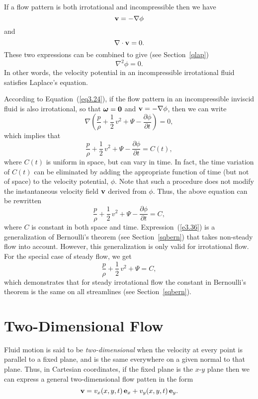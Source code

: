 If a flow pattern is both irrotational and incompressible then we have 
\begin{equation}
{\bf v} = -\nabla\phi
\end{equation}
and
\begin{equation}
\nabla\cdot{\bf v} = 0.
\end{equation}
These two expressions can be combined to give (see Section~\ref{qlap})
\begin{equation}
\nabla^2\phi = 0.
\end{equation}
In other words, the velocity potential in an incompressible irrotational fluid satisfies Laplace's equation. 

According to Equation~(\ref{eq3.24}),  if the flow pattern in an incompressible inviscid fluid is also irrotational, so that $\mbox{\boldmath$\omega$}={\bf 0}$ and ${\bf v}=-\nabla\phi$, then we can write
\begin{equation}
\nabla\left(\frac{p}{\rho} + \frac{1}{2}\,v^2 + \Psi - \frac{\partial\phi}{\partial t}\right)=0,
\end{equation}
which implies that
\begin{equation}
\frac{p}{\rho} + \frac{1}{2}\,v^2 + \Psi - \frac{\partial\phi}{\partial t} = C(t),
\end{equation}
where $C(t)$ is uniform in space, but can vary in time. In fact, the time variation of $C(t)$ can be eliminated
by adding the appropriate function of time (but not of space) to the velocity potential, $\phi$. Note that such
a procedure does not modify the instantaneous velocity field ${\bf v}$ derived from $\phi$. Thus, the above equation can
be rewritten
\begin{equation}
\frac{p}{\rho} + \frac{1}{2}\,v^2 + \Psi - \frac{\partial\phi}{\partial t} = C,\label{e3.36}
\end{equation}
where $C$ is constant in both space and time. Expression~(\ref{e3.36}) is a generalization of Bernoulli's theorem (see Section~\ref{sqbern})
that takes non-steady flow into account. However, this generalization is only valid for irrotational flow. For the special
case of steady flow, we get
\begin{equation}\label{e3.37}
\frac{p}{\rho} + \frac{1}{2}\,v^2 + \Psi = C,
\end{equation}
which demonstrates that for steady irrotational flow the constant in Bernoulli's theorem is the same on all streamlines (see Section~\ref{sqbern}). 

\section{Two-Dimensional Flow}\label{s2d}
Fluid motion is said to be {\em two-dimensional}\/ when the velocity at every point is parallel to
a fixed plane, and is the same everywhere on a given normal to that plane. Thus, in Cartesian coordinates, if the fixed plane is the
$x$-$y$ plane then we can express a general two-dimensional flow patten in the form
\begin{equation}
{\bf v} = v_x(x,y,t)\,{\bf e}_x + v_y(x,y,t)\,{\bf e}_y.
\end{equation}

